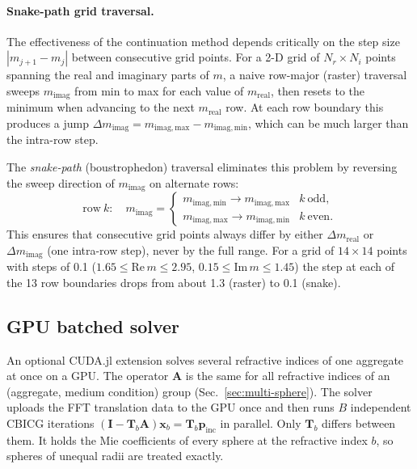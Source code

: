 \documentclass[11pt,a4paper]{article}
\begin{document}
\paragraph{Snake-path grid traversal.}
The effectiveness of the continuation method depends critically on the step size $|m_{j+1} - m_j|$ between consecutive grid points.
For a 2-D grid of $N_r \times N_i$ points spanning the real and imaginary parts of $m$, a naive row-major (raster) traversal sweeps $m_\mathrm{imag}$ from min to max for each value of $m_\mathrm{real}$, then resets to the minimum when advancing to the next $m_\mathrm{real}$ row.
At each row boundary this produces a jump $\Delta m_\mathrm{imag} = m_\mathrm{imag,max} - m_\mathrm{imag,min}$, which can be much larger than the intra-row step.

The \emph{snake-path} (boustrophedon) traversal eliminates this problem by reversing the sweep direction of $m_\mathrm{imag}$ on alternate rows:
\begin{equation*}
  \text{row}~k : \quad m_\mathrm{imag} = \begin{cases}
    m_\mathrm{imag,min} \to m_\mathrm{imag,max} & k~\text{odd}, \\
    m_\mathrm{imag,max} \to m_\mathrm{imag,min} & k~\text{even}.
  \end{cases}
\end{equation*}
This ensures that consecutive grid points always differ by either $\Delta m_\mathrm{real}$ or $\Delta m_\mathrm{imag}$ (one intra-row step), never by the full range.
For a grid of $14 \times 14$ points with steps of 0.1 ($1.65 \leq \mathrm{Re}\,m \leq 2.95$, $0.15 \leq \mathrm{Im}\,m \leq 1.45$) the step at each of the 13 row boundaries drops from about 1.3 (raster) to 0.1 (snake).

\subsection{GPU batched solver}
\label{sec:gpu}

An optional CUDA.jl extension solves several refractive indices of one aggregate at once on a GPU.
The operator $\mathbf{A}$ is the same for all refractive indices of an (aggregate, medium condition) group (Sec.~\ref{sec:multi-sphere}).
The solver uploads the FFT translation data to the GPU once and then runs $B$ independent CBICG iterations $(\mathbf{I} - \mathbf{T}_b \mathbf{A})\bm{x}_b = \mathbf{T}_b\bm{p}_\mathrm{inc}$ in parallel.
Only $\mathbf{T}_b$ differs between them.
It holds the Mie coefficients of every sphere at the refractive index $b$, so spheres of unequal radii are treated exactly.
\end{document}
